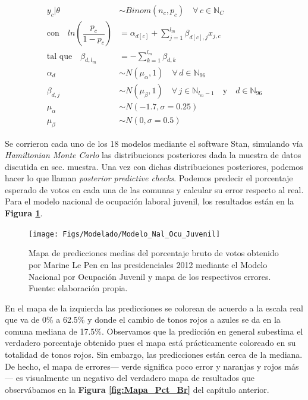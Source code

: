 \begin{align}\label{eq:Modelo_Jer_Ind}
y_c|\theta & \sim Binom(n_c,p_c) \quad \forall \, c \in \mathbb{N}_C \nonumber \\
\text{con} \quad ln\left(\dfrac{p_c}{1-p_c}\right) &= \alpha_{d[c]} + \sum\limits_{j=1}^{l_m} \beta_{d[c],j} x_{j,c} \nonumber\\ 
\text{tal que} \quad \beta_{d,l_m} &= -\sum\limits_{k = 1}^{l_m} \beta_{d,k} \nonumber \\
\alpha_d & \sim N(\mu_{\alpha}, 1) \quad \forall \, d \in \mathbb{N}_{96} \nonumber \\
\beta_{d,j} & \sim N(\mu_{\beta}, 1) \quad \forall \, j \in \mathbb{N}_{l_m-1}  \quad \text{y} \quad d \in \mathbb{N}_{96} \nonumber \\
\mu_{\alpha} &\sim N(-1.7,\sigma=0.25) \nonumber \\
\mu_{\beta} &\sim N(0,\sigma=0.5)
\end{align}

Se corrieron cada uno de los 18 modelos mediante el software Stan, simulando vía \textit{Hamiltonian Monte Carlo} las distribuciones posteriores dada la muestra de datos discutida en {\color{Red}sec. muestra}. Una vez con dichas distribuciones posteriores, podemos hacer lo que \textcite{Gelman13} llaman \textit{posterior predictive checks}. Podemos predecir el porcentaje esperado de votos en cada una de las comunas y calcular su error respecto al real. Para el modelo nacional de ocupación laboral juvenil, los resultados están en la \textbf{Figura \ref{fig:Modelo_Nal_Ocu_Juvenil}}.\\

\begin{figure}[h]
	\centering
	\texttt{[image: Figs/Modelado/Modelo\_Nal\_Ocu\_Juvenil]}
	\caption{Mapa de predicciones medias del porcentaje bruto de votos obtenido por Marine Le Pen en las presidenciales 2012 mediante el Modelo Nacional por Ocupación Juvenil y mapa de los respectivos errores. Fuente: elaboración propia.}
	\label{fig:Modelo_Nal_Ocu_Juvenil}
\end{figure}

En el mapa de la izquierda las predicciones se colorean de acuerdo a la escala real que va de 0\% a 62.5\% y donde el cambio de tonos rojos a azules se da en la comuna mediana de 17.5\%. Observamos que la predicción en general subestima el verdadero porcentaje obtenido pues el mapa está prácticamente coloreado en su totalidad de tonos rojos. Sin embargo, las predicciones están cerca de la mediana. De hecho, el mapa de errores--- verde significa poco error y naranjas y rojos más--- es visualmente un negativo del verdadero mapa de resultados que observábamos en la \textbf{Figura \ref{fig:Mapa_Pct_Br}} del capítulo anterior.\\

